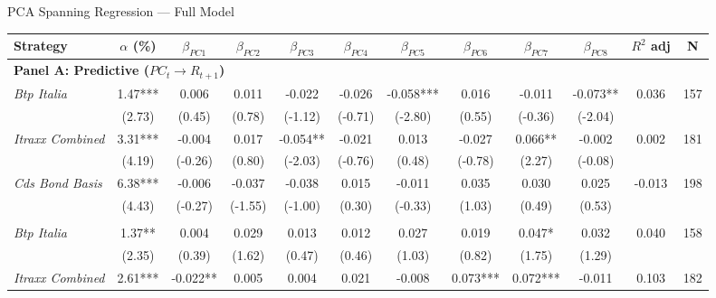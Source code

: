 \documentclass[aspectratio=169,11pt]{beamer}
\begin{document}
\begin{frame}[t,shrink=15]{PCA Spanning Regression — Full Model}

\scriptsize


\centering
\begin{threeparttable}
\setlength{\tabcolsep}{2pt}
\renewcommand{\arraystretch}{1.05}
\begin{tabular}{lccccccccccc}
\toprule
Strategy & $\alpha$ (\%) & $\beta_{PC1}$ & $\beta_{PC2}$ & $\beta_{PC3}$ & $\beta_{PC4}$ & $\beta_{PC5}$ & $\beta_{PC6}$ & $\beta_{PC7}$ & $\beta_{PC8}$ & $R^2$ adj & N \\
\midrule
\multicolumn{12}{l}{\textbf{Panel A: Predictive ($PC_t \to R_{t+1}$)}} \\
\addlinespace
\textit{Btp Italia} & 1.47*** & 0.006 & 0.011 & -0.022 & -0.026 & -0.058*** & 0.016 & -0.011 & -0.073** & 0.036 & 157 \\
 & (2.73) & (0.45) & (0.78) & (-1.12) & (-0.71) & (-2.80) & (0.55) & (-0.36) & (-2.04) & & \\
\addlinespace
\textit{Itraxx Combined} & 3.31*** & -0.004 & 0.017 & -0.054** & -0.021 & 0.013 & -0.027 & 0.066** & -0.002 & 0.002 & 181 \\
 & (4.19) & (-0.26) & (0.80) & (-2.03) & (-0.76) & (0.48) & (-0.78) & (2.27) & (-0.08) & & \\
\addlinespace
\textit{Cds Bond Basis} & 6.38*** & -0.006 & -0.037 & -0.038 & 0.015 & -0.011 & 0.035 & 0.030 & 0.025 & -0.013 & 198 \\
 & (4.43) & (-0.27) & (-1.55) & (-1.00) & (0.30) & (-0.33) & (1.03) & (0.49) & (0.53) & & \\
\addlinespace
\midrule
\multicolumn{12}{l}{\textbf{Panel B: Contemporaneous ($PC_t \to R_t$)}} \\
\addlinespace
\textit{Btp Italia} & 1.37** & 0.004 & 0.029 & 0.013 & 0.012 & 0.027 & 0.019 & 0.047* & 0.032 & 0.040 & 158 \\
 & (2.35) & (0.39) & (1.62) & (0.47) & (0.46) & (1.03) & (0.82) & (1.75) & (1.29) & & \\
\addlinespace
\textit{Itraxx Combined} & 2.61*** & -0.022** & 0.005 & 0.004 & 0.021 & -0.008 & 0.073*** & 0.072*** & -0.011 & 0.103 & 182 \\

\end{tabular}
\end{threeparttable}
\end{frame}
\end{document}
